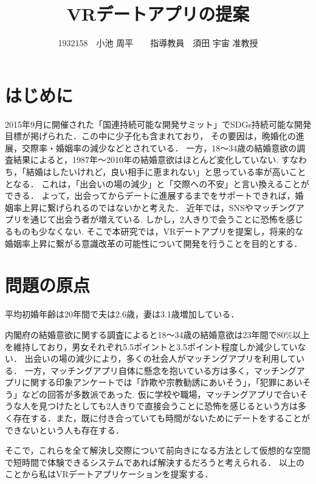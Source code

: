 \documentclass[twocolumn,10pt,a4j]{ltjsarticle}
\title{VRデートアプリの提案}
\author{1932158　小池 周平　　指導教員　須田 宇宙 准教授}
\date{ }
\begin{document}
\maketitle

\section{はじめに}



2015年9月に開催された「国連持続可能な開発サミット」でSDGs持続可能な開発目標が掲げられた．この中に少子化も含まれており，
その要因は，晩婚化の進展\cite{sasaki2012}，交際率・婚姻率の減少\cite{naikakufu2019}などとされている．
一方，18〜34歳の結婚意欲の調査結果によると，1987年〜2010年の結婚意欲はほとんど変化していない.
すなわち，「結婚はしたいけれど，良い相手に恵まれない」と思っている率が高いこととなる\cite{naikakufu2019}．
これは，「出会いの場の減少」と「交際への不安」と言い換えることができる．
よって，出会ってからデートに進展するまでをサポートできれば，婚姻率上昇に繋げられるのではないかと考えた．
近年では，SNSやマッチングアプリを通じて出会う者が増えている.
しかし，2人きりで会うことに恐怖を感じるものも少なくない\cite{prtimes,yoshimura2020}.
そこで本研究では，VRデートアプリを提案し，将来的な婚姻率上昇に繋がる意識改革の可能性について開発を行うことを目的とする．



\section{問題の原点}
平均初婚年齢は20年間で夫は2.6歳，妻は3.1歳増加している．

内閣府の結婚意欲に関する調査によると18～34歳の結婚意欲は23年間で80\%以上を維持しており，男女それぞれ5.5ポイントと3.5ポイント程度しか減少していない．
出会いの場の減少により，多くの社会人がマッチングアプリを利用している．
一方，マッチングアプリ自体に懸念を抱いている方は多く，マッチングアプリに関する印象アンケートでは「詐欺や宗教勧誘にあいそう」，「犯罪にあいそう」などの回答が多数派であった\cite{prtimes}.
仮に学校や職場，マッチングアプリで合いそうな人を見つけたとしても2人きりで直接会うことに恐怖を感じるという方は多く存在する\cite{yoshimura2020}．また，既に付き合っていても時間がないためにデートをすることができないという人も存在する．


そこで，これらを全て解決し交際について前向きになる方法として仮想的な空間で短時間で体験できるシステムであれば解決するだろうと考えられる．
以上のことから私はVRデートアプリケーションを提案する．
\end{document}

